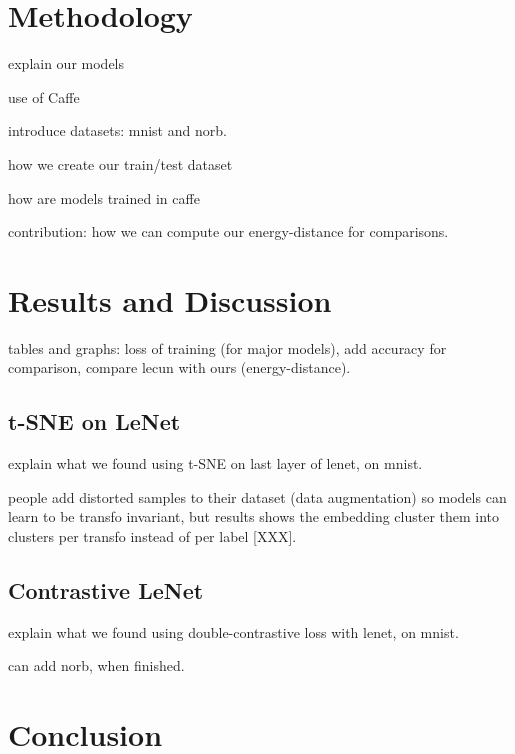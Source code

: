 \documentclass[a4paper,12pt]{report}
\begin{document}
\chapter{Methodology}

explain our models

use of Caffe

introduce datasets: mnist and norb.

how we create our train/test dataset

how are models trained in caffe

contribution: how we can compute our energy-distance for comparisons.


\chapter{Results and Discussion}

tables and graphs: loss of training (for major models), add accuracy for comparison, compare lecun with ours (energy-distance).

\section{t-SNE on LeNet}
explain what we found using t-SNE on last layer of lenet, on mnist.

people add distorted samples to their dataset (data augmentation) so models can learn to be transfo invariant, but results shows the embedding cluster them into clusters per transfo instead of per label [XXX].

\section{Contrastive LeNet}
explain what we found using double-contrastive loss with lenet, on mnist.

can add norb, when finished.


\chapter{Conclusion}

{}


\nocite{lecun2004learning}
\end{document}
